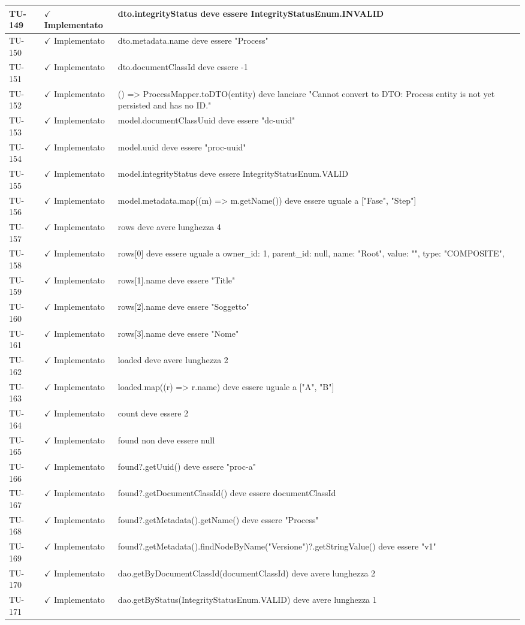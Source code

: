 ﻿\documentclass[a4paper,12pt]{article}
\newcommand{\ok}{\textcolor{green!60!black}{$\checkmark$ Implementato}}
\begin{document}
\begin{longtable}{|p{2cm}|p{3.5cm}|p{9.5cm}|}
\hline
TU-149 & \ok & dto.integrityStatus deve essere IntegrityStatusEnum.INVALID \\
\hline
TU-150 & \ok & dto.metadata.name deve essere "Process" \\
\hline
TU-151 & \ok & dto.documentClassId deve essere -1 \\
\hline
TU-152 & \ok & () => ProcessMapper.toDTO(entity) deve lanciare "Cannot convert to DTO: Process entity is not yet persisted and has no ID." \\
\hline
TU-153 & \ok & model.documentClassUuid deve essere "dc-uuid" \\
\hline
TU-154 & \ok & model.uuid deve essere "proc-uuid" \\
\hline
TU-155 & \ok & model.integrityStatus deve essere IntegrityStatusEnum.VALID \\
\hline
TU-156 & \ok & model.metadata.map((m) => m.getName()) deve essere uguale a ["Fase", "Step"] \\
\hline
TU-157 & \ok & rows deve avere lunghezza 4 \\
\hline
TU-158 & \ok & rows[0] deve essere uguale a { owner\_id: 1, parent\_id: null, name: "Root", value: "", type: "COMPOSITE", } \\
\hline
TU-159 & \ok & rows[1].name deve essere "Title" \\
\hline
TU-160 & \ok & rows[2].name deve essere "Soggetto" \\
\hline
TU-161 & \ok & rows[3].name deve essere "Nome" \\
\hline
TU-162 & \ok & loaded deve avere lunghezza 2 \\
\hline
TU-163 & \ok & loaded.map((r) => r.name) deve essere uguale a ["A", "B"] \\
\hline
TU-164 & \ok & count deve essere 2 \\
\hline
TU-165 & \ok & found non deve essere null \\
\hline
TU-166 & \ok & found?.getUuid() deve essere "proc-a" \\
\hline
TU-167 & \ok & found?.getDocumentClassId() deve essere documentClassId \\
\hline
TU-168 & \ok & found?.getMetadata().getName() deve essere "Process" \\
\hline
TU-169 & \ok & found?.getMetadata().findNodeByName("Versione")?.getStringValue() deve essere "v1" \\
\hline
TU-170 & \ok & dao.getByDocumentClassId(documentClassId) deve avere lunghezza 2 \\
\hline
TU-171 & \ok & dao.getByStatus(IntegrityStatusEnum.VALID) deve avere lunghezza 1 \\

\end{longtable}
\end{document}
